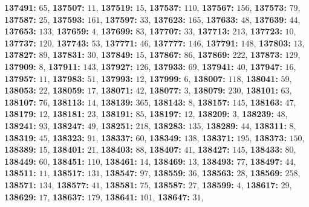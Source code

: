 \textsf{\bfseries 137491:} $65$, \textsf{\bfseries 137507:} $11$, \textsf{\bfseries 137519:} $15$, \textsf{\bfseries 137537:} $110$, \textsf{\bfseries 137567:} $156$, \textsf{\bfseries 137573:} $79$, \textsf{\bfseries 137587:} $25$, \textsf{\bfseries 137593:} $161$, \textsf{\bfseries 137597:} $33$, \textsf{\bfseries 137623:} $165$, \textsf{\bfseries 137633:} $48$, \textsf{\bfseries 137639:} $44$, \textsf{\bfseries 137653:} $133$, \textsf{\bfseries 137659:} $4$, \textsf{\bfseries 137699:} $83$, \textsf{\bfseries 137707:} $33$, \textsf{\bfseries 137713:} $213$, \textsf{\bfseries 137723:} $10$, \textsf{\bfseries 137737:} $120$, \textsf{\bfseries 137743:} $53$, \textsf{\bfseries 137771:} $46$, \textsf{\bfseries 137777:} $146$, \textsf{\bfseries 137791:} $148$, \textsf{\bfseries 137803:} $13$, \textsf{\bfseries 137827:} $89$, \textsf{\bfseries 137831:} $30$, \textsf{\bfseries 137849:} $15$, \textsf{\bfseries 137867:} $86$, \textsf{\bfseries 137869:} $222$, \textsf{\bfseries 137873:} $129$, \textsf{\bfseries 137909:} $8$, \textsf{\bfseries 137911:} $143$, \textsf{\bfseries 137927:} $126$, \textsf{\bfseries 137933:} $69$, \textsf{\bfseries 137941:} $40$, \textsf{\bfseries 137947:} $16$, \textsf{\bfseries 137957:} $11$, \textsf{\bfseries 137983:} $51$, \textsf{\bfseries 137993:} $12$, \textsf{\bfseries 137999:} $6$, \textsf{\bfseries 138007:} $118$, \textsf{\bfseries 138041:} $59$, \textsf{\bfseries 138053:} $22$, \textsf{\bfseries 138059:} $17$, \textsf{\bfseries 138071:} $42$, \textsf{\bfseries 138077:} $3$, \textsf{\bfseries 138079:} $230$, \textsf{\bfseries 138101:} $63$, \textsf{\bfseries 138107:} $76$, \textsf{\bfseries 138113:} $14$, \textsf{\bfseries 138139:} $365$, \textsf{\bfseries 138143:} $8$, \textsf{\bfseries 138157:} $145$, \textsf{\bfseries 138163:} $47$, \textsf{\bfseries 138179:} $12$, \textsf{\bfseries 138181:} $23$, \textsf{\bfseries 138191:} $85$, \textsf{\bfseries 138197:} $12$, \textsf{\bfseries 138209:} $3$, \textsf{\bfseries 138239:} $48$, \textsf{\bfseries 138241:} $93$, \textsf{\bfseries 138247:} $49$, \textsf{\bfseries 138251:} $218$, \textsf{\bfseries 138283:} $135$, \textsf{\bfseries 138289:} $44$, \textsf{\bfseries 138311:} $8$, \textsf{\bfseries 138319:} $45$, \textsf{\bfseries 138323:} $91$, \textsf{\bfseries 138337:} $60$, \textsf{\bfseries 138349:} $138$, \textsf{\bfseries 138371:} $195$, \textsf{\bfseries 138373:} $150$, \textsf{\bfseries 138389:} $15$, \textsf{\bfseries 138401:} $21$, \textsf{\bfseries 138403:} $88$, \textsf{\bfseries 138407:} $41$, \textsf{\bfseries 138427:} $145$, \textsf{\bfseries 138433:} $80$, \textsf{\bfseries 138449:} $60$, \textsf{\bfseries 138451:} $110$, \textsf{\bfseries 138461:} $14$, \textsf{\bfseries 138469:} $13$, \textsf{\bfseries 138493:} $77$, \textsf{\bfseries 138497:} $44$, \textsf{\bfseries 138511:} $11$, \textsf{\bfseries 138517:} $131$, \textsf{\bfseries 138547:} $97$, \textsf{\bfseries 138559:} $36$, \textsf{\bfseries 138563:} $28$, \textsf{\bfseries 138569:} $258$, \textsf{\bfseries 138571:} $134$, \textsf{\bfseries 138577:} $41$, \textsf{\bfseries 138581:} $75$, \textsf{\bfseries 138587:} $27$, \textsf{\bfseries 138599:} $4$, \textsf{\bfseries 138617:} $29$, \textsf{\bfseries 138629:} $17$, \textsf{\bfseries 138637:} $179$, \textsf{\bfseries 138641:} $101$, \textsf{\bfseries 138647:} $31$, 
